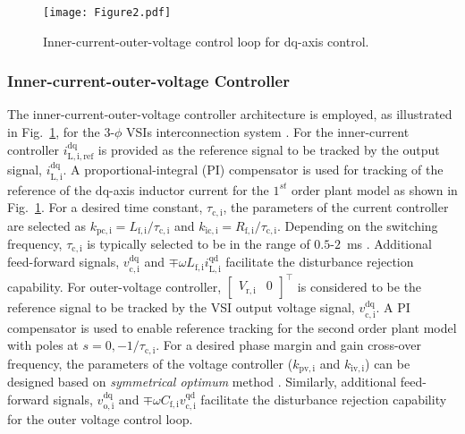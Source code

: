 \documentclass[journal]{IEEEtran}
\begin{document}
\begin{figure}[t]
	\centering
    \texttt{[image: Figure2.pdf]}%
	\caption{Inner-current-outer-voltage control loop for $\mathrm{dq}$-axis control.}
	\label{fig:controller}
\end{figure}
\subsubsection{Inner-current-outer-voltage Controller}
The inner-current-outer-voltage controller architecture is employed, as illustrated in Fig.~\ref{fig:controller}, for the $3$-$\phi$ VSIs interconnection system \cite{iravani}. For the inner-current controller $i^\mathrm{dq}_\mathrm{L,i,ref}$ is provided as the reference signal to be tracked by the output signal, $i^\mathrm{dq}_\mathrm{L,i}$. A proportional-integral (PI) compensator is used for tracking of the reference of the $\mathrm{dq}$-axis inductor current for the $1^{st}$ order plant model as shown in Fig.~\ref{fig:controller}. For a desired time constant, $\tau_\mathrm{c,i}$, the parameters of the current controller are selected as $k_\mathrm{pc,i}=L_\mathrm{f,i}/\tau_\mathrm{c,i}$ and $k_\mathrm{ic,i}=R_\mathrm{f,i}/\tau_\mathrm{c,i}$. Depending on the switching frequency, $\tau_\mathrm{c,i}$ is typically selected to be in the range of $0.5$-$2$~ms \cite{iravani}. Additional feed-forward signals, $v^\mathrm{dq}_\mathrm{c,i}$ and $\mp \omega L_\mathrm{f,i}i^\mathrm{qd}_\mathrm{L,i}$ facilitate the disturbance rejection capability. For outer-voltage controller,  $\begin{bmatrix}V_\mathrm{r,i} & 0\end{bmatrix}^\top$ is considered to be the reference signal to be tracked by the VSI output voltage signal, $v^\mathrm{dq}_\mathrm{c,i}$. A PI compensator is used to enable reference tracking for the second order plant model with poles at $s=0, -1/\tau_\mathrm{c,i}$. For a desired phase margin and gain cross-over frequency, the parameters of the voltage controller ($k_\mathrm{pv,i}$ and $k_\mathrm{iv,i}$) can be designed based on \textit{symmetrical optimum} method \cite{iravani}. Similarly, additional feed-forward signals, $v^\mathrm{dq}_\mathrm{o,i}$ and $\mp \omega C_\mathrm{f,i}v^\mathrm{qd}_\mathrm{c,i}$ facilitate the disturbance rejection capability for the outer voltage control loop.
\end{document}
